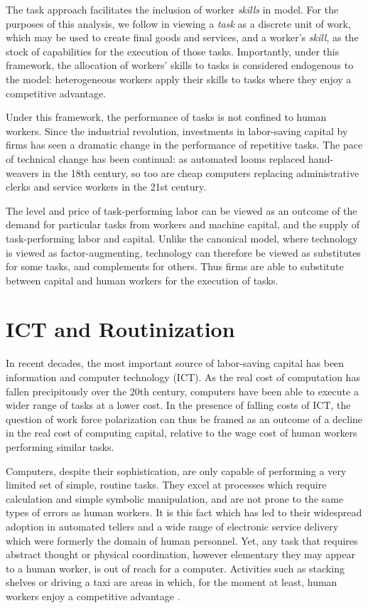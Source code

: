 \documentclass[a4paper,11pt]{article}
\begin{document}
The task approach facilitates the inclusion of worker \emph{skills} in model. For the purposes of this analysis, we follow \citet{Autor2013} in viewing a \emph{task} as a discrete unit of work, which may be used to create final goods and services, and a worker's \emph{skill}, as the stock of capabilities for the execution of those tasks. Importantly, under this framework, the allocation of workers' skills to tasks is considered endogenous to the model: heterogeneous workers apply their skills to tasks where they enjoy a competitive advantage.

Under this framework, the performance of tasks is not confined to human workers. Since the industrial revolution, investments in labor-saving capital by firms has seen a dramatic change in the performance of repetitive tasks. The pace of technical change has been continual: as automated looms replaced hand-weavers in the 18th century, so too are cheap computers replacing administrative clerks and service workers in the 21st century.

The level and price of task-performing labor can be 
viewed as an outcome of the demand for particular tasks from workers and machine capital, and the supply of task-performing labor and capital. Unlike the canonical model, where technology is viewed as factor-augmenting,  technology can therefore be viewed as substitutes for some tasks, and complements for others. Thus firms are able to substitute between capital and human workers for the execution of tasks.

\section{ICT and Routinization}

In recent decades, the most important source of labor-saving capital has been information and computer technology (ICT). As the real cost of computation has fallen precipitously over the 20th century, computers have been able to execute a wider range of tasks at a lower cost. In the presence of falling costs of ICT, the question of work force polarization can thus be framed as an outcome of a decline in the real cost of computing capital, relative to the wage cost of human workers performing similar tasks.

Computers, despite their sophistication, are only capable of performing a very limited set of simple, routine tasks. They excel at processes which require calculation and simple symbolic manipulation, and are not prone to the same types of errors as human workers. It is this fact which has led to their widespread adoption in automated tellers and a wide range of electronic service delivery which were formerly the domain of human personnel. Yet, any task that requires abstract thought or physical coordination, however elementary they may appear to a human worker, is out of reach for a computer. Activities such as stacking shelves or driving a taxi are areas in which, for the moment at least, human workers enjoy a competitive advantage \citet{Levy2003}. 
\end{document}
